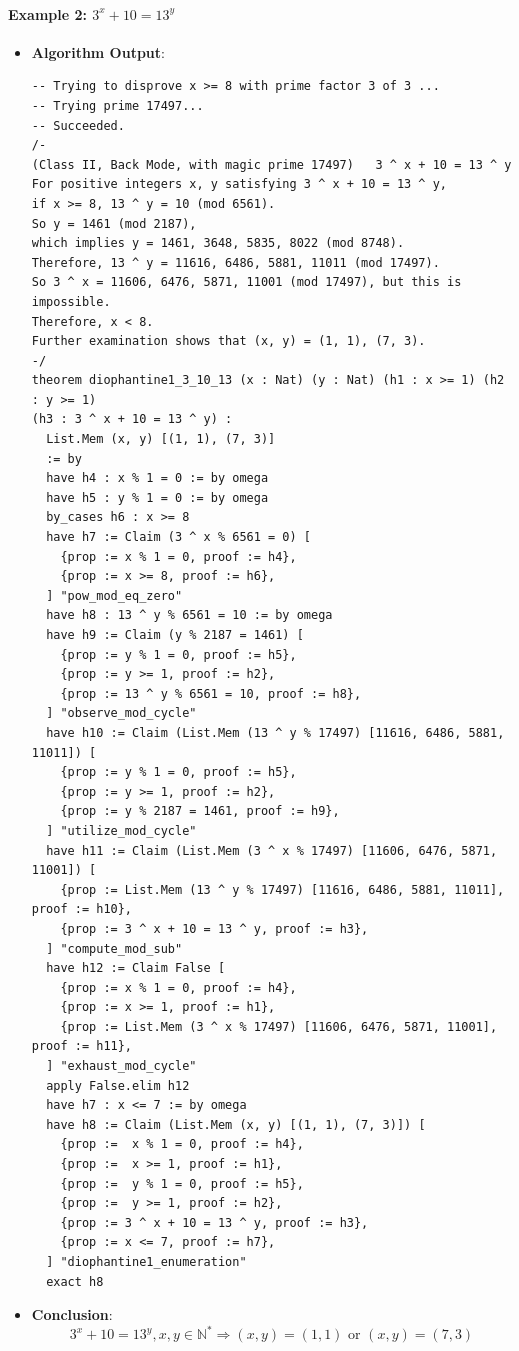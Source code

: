 \documentclass{article}
\begin{document}
\paragraph{Example 2: $3^x+10=13^y$}
\begin{itemize}
\item \textbf{Algorithm Output}:
    \begin{verbatim}
-- Trying to disprove x >= 8 with prime factor 3 of 3 ...
-- Trying prime 17497...
-- Succeeded.
/-
(Class II, Back Mode, with magic prime 17497)   3 ^ x + 10 = 13 ^ y
For positive integers x, y satisfying 3 ^ x + 10 = 13 ^ y,
if x >= 8, 13 ^ y = 10 (mod 6561).
So y = 1461 (mod 2187),
which implies y = 1461, 3648, 5835, 8022 (mod 8748).
Therefore, 13 ^ y = 11616, 6486, 5881, 11011 (mod 17497).
So 3 ^ x = 11606, 6476, 5871, 11001 (mod 17497), but this is impossible.
Therefore, x < 8.
Further examination shows that (x, y) = (1, 1), (7, 3).
-/
theorem diophantine1_3_10_13 (x : Nat) (y : Nat) (h1 : x >= 1) (h2 : y >= 1) 
(h3 : 3 ^ x + 10 = 13 ^ y) :  
  List.Mem (x, y) [(1, 1), (7, 3)]
  := by
  have h4 : x % 1 = 0 := by omega
  have h5 : y % 1 = 0 := by omega
  by_cases h6 : x >= 8
  have h7 := Claim (3 ^ x % 6561 = 0) [
    {prop := x % 1 = 0, proof := h4},
    {prop := x >= 8, proof := h6},
  ] "pow_mod_eq_zero"
  have h8 : 13 ^ y % 6561 = 10 := by omega
  have h9 := Claim (y % 2187 = 1461) [
    {prop := y % 1 = 0, proof := h5},
    {prop := y >= 1, proof := h2},
    {prop := 13 ^ y % 6561 = 10, proof := h8},
  ] "observe_mod_cycle"
  have h10 := Claim (List.Mem (13 ^ y % 17497) [11616, 6486, 5881, 11011]) [
    {prop := y % 1 = 0, proof := h5},
    {prop := y >= 1, proof := h2},
    {prop := y % 2187 = 1461, proof := h9},
  ] "utilize_mod_cycle"
  have h11 := Claim (List.Mem (3 ^ x % 17497) [11606, 6476, 5871, 11001]) [
    {prop := List.Mem (13 ^ y % 17497) [11616, 6486, 5881, 11011], proof := h10},
    {prop := 3 ^ x + 10 = 13 ^ y, proof := h3},
  ] "compute_mod_sub"
  have h12 := Claim False [
    {prop := x % 1 = 0, proof := h4},
    {prop := x >= 1, proof := h1},
    {prop := List.Mem (3 ^ x % 17497) [11606, 6476, 5871, 11001], proof := h11},
  ] "exhaust_mod_cycle"
  apply False.elim h12
  have h7 : x <= 7 := by omega
  have h8 := Claim (List.Mem (x, y) [(1, 1), (7, 3)]) [
    {prop :=  x % 1 = 0, proof := h4},
    {prop :=  x >= 1, proof := h1},
    {prop :=  y % 1 = 0, proof := h5},
    {prop :=  y >= 1, proof := h2},
    {prop := 3 ^ x + 10 = 13 ^ y, proof := h3},
    {prop := x <= 7, proof := h7},
  ] "diophantine1_enumeration"
  exact h8
    \end{verbatim}
    \item \textbf{Conclusion}:
    \[ 3^x+10=13^y, x, y \in \mathbb{N}^* \Rightarrow (x,y)=(1,1) \text{ or } (x,y)=(7,3) \]
\end{itemize}
\end{document}
